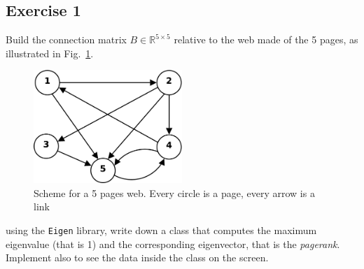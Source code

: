 \subsection*{Exercise 1}

Build the connection matrix $B\in \mathbb{R}^{5 \times 5}$ relative to the web
made of the 5 pages, as illustrated in Fig.~\ref{fig:web}.

\begin{figure}
\centering
\includegraphics[width=0.5\textwidth]{fig/web}
\caption{Scheme for a 5 pages web. Every circle is a page, every arrow is a
link}
\label{fig:web}
\end{figure}

using the \texttt{Eigen} library, write down a class that computes the maximum
eigenvalue (that is 1) and the corresponding eigenvector, that is the
\emph{pagerank}. Implement also  to see the data inside the
class on the screen.
